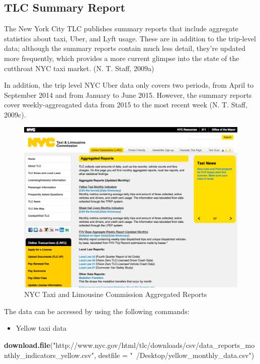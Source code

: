 \documentclass[12pt,twoside]{reedthesis}
\newenvironment{Shaded}{\begin{snugshade}}{\end{snugshade}}
\newcommand{\KeywordTok}[1]{\textcolor[rgb]{0.13,0.29,0.53}{\textbf{#1}}}
\newcommand{\DataTypeTok}[1]{\textcolor[rgb]{0.13,0.29,0.53}{#1}}
\newcommand{\StringTok}[1]{\textcolor[rgb]{0.31,0.60,0.02}{#1}}
\newcommand{\NormalTok}[1]{#1}
\providecommand{\tightlist}{%
  \setlength{\itemsep}{0pt}\setlength{\parskip}{0pt}}
\theoremstyle{definition}
\theoremstyle{definition}
\theoremstyle{definition}
\theoremstyle{remark}
\begin{document}
\subsection{TLC Summary Report}\label{tlc-summary-report}

The New York City TLC publishes summary reports that include aggregate
statistics about taxi, Uber, and Lyft usage. These are in addition to
the trip-level data; although the summary reports contain much less
detail, they're updated more frequently, which provides a more current
glimpse into the state of the cutthroat NYC taxi market. (N. T. Staff,
2009a)

In addition, the trip level NYC Uber data only covers two periods, from
April to September 2014 and from January to June 2015. However, the
summary reports cover weekly-aggreagated data from 2015 to the most
recent week (N. T. Staff, 2009c).
\begin{figure}

{\centering \includegraphics[width=5.84in]{figure/a-report} 

}

\caption{NYC Taxi and Limousine Commission Aggregated Reports}\label{fig:a-report}
\end{figure}
The data can be accessed by using the following commands:
\begin{itemize}
\tightlist
\item
  Yellow taxi data
\end{itemize}
\begin{Shaded}
\begin{Highlighting}[]
\KeywordTok{download.file}\NormalTok{(}\StringTok{"http://www.nyc.gov/html/tlc/downloads/csv/data_reports_monthly_indicators_yellow.csv"}\NormalTok{, }\DataTypeTok{destfile =} \StringTok{"~/Desktop/yellow_monthly_data.csv"}\NormalTok{)}
\end{Highlighting}
\end{Shaded}
\end{document}
